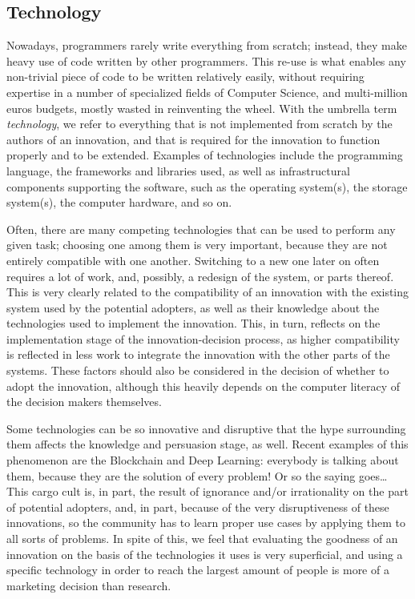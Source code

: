 \documentclass[12pt]{article}
\begin{document}
\subsection{Technology}
\label{sec:org6fb878a}
Nowadays, programmers rarely write everything from scratch; instead, they make heavy use of code written by other programmers. This re-use is what enables any non-trivial piece of code to be written relatively easily, without requiring expertise in a number of specialized fields of Computer Science, and multi-million euros budgets, mostly wasted in reinventing the wheel. With the umbrella term \emph{technology}, we refer to everything that is not implemented from scratch by the authors of an innovation, and that is required for the innovation to function properly and to be extended. Examples of technologies include the programming language, the frameworks and libraries used, as well as infrastructural components supporting the software, such as the operating system(s), the storage system(s), the computer hardware, and so on.

Often, there are many competing technologies that can be used to perform any given task; choosing one among them is very important, because they are not entirely compatible with one another. Switching to a new one later on often requires a lot of work, and, possibly, a redesign of the system, or parts thereof. This is very clearly related to the compatibility of an innovation with the existing system used by the potential adopters, as well as their knowledge about the technologies used to implement the innovation. This, in turn, reflects on the implementation stage of the innovation-decision process, as higher compatibility is reflected in less work to integrate the innovation with the other parts of the systems. These factors should also be considered in the decision of whether to adopt the innovation, although this heavily depends on the computer literacy of the decision makers themselves.

Some technologies can be so innovative and disruptive that the hype surrounding them affects the knowledge and persuasion stage, as well. Recent examples of this phenomenon are the Blockchain and Deep Learning: everybody is talking about them, because they are the solution of every problem! Or so the saying goes\ldots{} This cargo cult is, in part, the result of ignorance and/or irrationality on the part of potential adopters, and, in part, because of the very disruptiveness of these innovations, so the community has to learn proper use cases by applying them to all sorts of problems. In spite of this, we feel that evaluating the goodness of an innovation on the basis of the technologies it uses is very superficial, and using a specific technology in order to reach the largest amount of people is more of a marketing decision than research.
\end{document}
